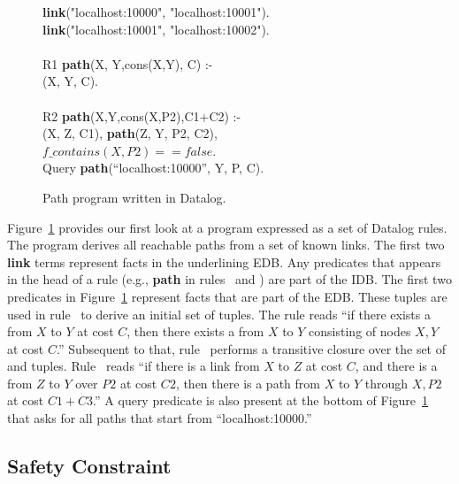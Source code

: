 \begin{figure}
\ssp
\begin{boxedminipage}{\linewidth}
{\bf link}("localhost:10000", "localhost:10001"). \\
{\bf link}("localhost:10001", "localhost:10002"). \\
\\
R1 {\bf path}(X, Y,cons(X,Y), C) :- \\
(X, Y, C). \\
\\       
R2 {\bf path}(X,Y,cons(X,P2),C1+C2) :- \\
(X, Z, C1), {\bf path}(Z, Y, P2, C2), \\
\datalogspace $f\_contains(X,P2) == false$. \\

Query {\bf path}(``localhost:10000'', Y, P, C).
\end{boxedminipage}
\caption{\label{ch:p2:fig:datalogPath}Path program written in Datalog.}
\end{figure}

Figure~\ref{ch:p2:fig:datalogPath} provides our first look at a program
expressed as a set of Datalog rules.  The program derives all reachable paths
from a set of known links.  The first two {\bf link} terms represent facts in
the underlining EDB.  Any predicates that appears in the head of a rule (e.g.,
{\bf path} in rules~ and ) are part of the IDB.  The first two
 predicates in Figure~\ref{ch:p2:fig:datalogPath} represent facts that
are part of the EDB.  These  tuples are used in rule~ to derive
an initial set of  tuples.  The rule reads ``if there exists a
 from $X$ to $Y$ at cost $C$, then there exists a  from $X$
to $Y$ consisting of nodes $X, Y$ at cost $C$.'' Subsequent to that,
rule~ performs a transitive closure over the set of  and
 tuples.  Rule~ reads ``if there is a link from $X$ to $Z$ at
cost $C$, and there is a  from $Z$ to $Y$ over $P2$ at cost $C2$, then
there is a path from $X$ to $Y$ through $X, P2$ at cost $C1+C3$.'' A query
predicate is also present at the bottom of Figure~\ref{ch:p2:fig:datalogPath}
that asks for all paths that start from ``localhost:10000.''

\subsection{Safety Constraint}

